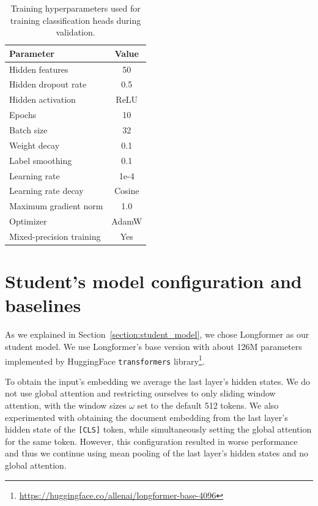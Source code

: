 \begin{table}
  \centering
  \footnotesize

  \begin{tabular}{l c}
    \toprule
    Parameter & Value \\
    \midrule
    Hidden features & 50 \\
    Hidden dropout rate & 0.5 \\
    Hidden activation & ReLU \\
    Epochs & 10 \\
    Batch size & 32 \\
    Weight decay & 0.1 \\
    Label smoothing & 0.1 \\
    Learning rate & 1e-4 \\
    Learning rate decay & Cosine \\
    Maximum gradient norm & 1.0 \\
    Optimizer & AdamW \\
    Mixed-precision training & Yes \\
    \bottomrule
  \end{tabular}

  \caption{Training hyperparameters used for training classification heads
  during validation.}

  \label{table:head_train_params}

\end{table}

\section{Student's model configuration and baselines}\label{section:student_model_config_baselines}

As we explained in Section~\ref{section:student_model}, we chose
Longformer \citep{beltagy2020longformer} as our student model. We use
Longformer's base version with about 126M parameters implemented by
HuggingFace \texttt{transformers}
library\footnote{\url{https://huggingface.co/allenai/longformer-base-4096}}.

To obtain the input's embedding we average the last layer's hidden states. We
do not use global attention and restricting ourselves to only sliding window
attention, with the window sizes $\omega$ set to the default 512 tokens. We
also experimented with obtaining the document embedding from the last layer's
hidden state of the \texttt{[CLS]} token, while simultaneously setting the
global attention for the same token. However, this configuration resulted in
worse performance and thus we continue using mean pooling of the last layer's
hidden states and no global attention.

